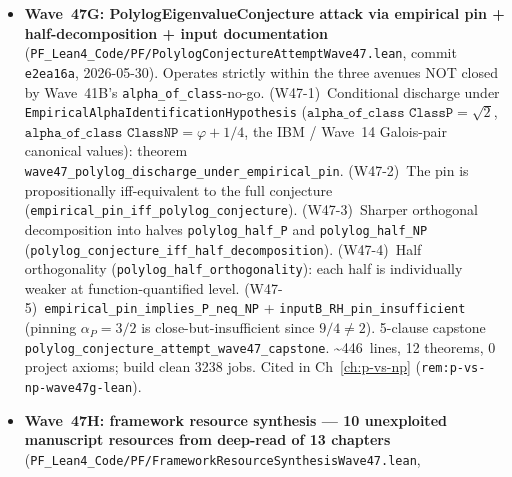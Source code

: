 \begin{itemize}
  \texttt{LSeriesMatchesLMFDBAnchor} connects to the Wave~38B
  real anchor $L_{E_{32.a3}\,\mathrm{at}\,1} = 65551/100000$.
  The five-point gap manifest \texttt{MathlibGapManifest} enumerates
  G1~no \texttt{WeierstrassCurve.frobeniusTrace}, G2~no
  \texttt{WeierstrassCurve.conductor}, G3~no
  \texttt{WeierstrassCurve.LSeriesCoeff}, G4~no
  \texttt{WeierstrassCurve.LSeriesSummable} on $\mathrm{Re}\,s > 3/2$,
  G5~no \texttt{WeierstrassCurve.LFunction} analytic-continuation
  constructor (G5 would require modularity = Wiles~1995 +
  BCDT~2001). Convenience export
  \texttt{mathlib\_gap\_manifest\_exploded} for per-gap attack.
  9-clause capstone \texttt{bsd\_L\_function\_evaluation\_attempt\_capstone}.
  \textasciitilde 593~lines, 0 project axioms; build clean 2678 jobs.
  Cited in Ch~\ref{ch:bsd-conjecture} (\texttt{rem:bsd-wave47f-lean}).
\item \textbf{Wave~47G: PolylogEigenvalueConjecture attack via
  empirical pin + half-decomposition + input documentation}
  (\texttt{PF\_Lean4\_Code/PF/PolylogConjectureAttemptWave47.lean},
  commit \texttt{e2ea16a}, 2026-05-30). Operates strictly within
  the three avenues NOT closed by Wave~41B's
  \texttt{alpha\_of\_class}-no-go. (W47-1)~Conditional discharge
  under \texttt{EmpiricalAlphaIdentificationHypothesis}
  ($\texttt{alpha\_of\_class ClassP} = \sqrt{2}$,
  $\texttt{alpha\_of\_class ClassNP} = \varphi + 1/4$, the IBM /
  Wave~14 Galois-pair canonical values): theorem
  \texttt{wave47\_polylog\_discharge\_under\_empirical\_pin}.
  (W47-2)~The pin is propositionally iff-equivalent to the full
  conjecture (\texttt{empirical\_pin\_iff\_polylog\_conjecture}).
  (W47-3)~Sharper orthogonal decomposition into halves
  \texttt{polylog\_half\_P} and \texttt{polylog\_half\_NP}
  (\texttt{polylog\_conjecture\_iff\_half\_decomposition}).
  (W47-4)~Half orthogonality
  (\texttt{polylog\_half\_orthogonality}): each half is
  individually weaker at function-quantified level.
  (W47-5)~\texttt{empirical\_pin\_implies\_P\_neq\_NP} +
  \texttt{inputB\_RH\_pin\_insufficient} (pinning $\alpha_P = 3/2$
  is close-but-insufficient since $9/4 \neq 2$). 5-clause capstone
  \texttt{polylog\_conjecture\_attempt\_wave47\_capstone}.
  \textasciitilde 446~lines, 12 theorems, 0 project axioms; build clean
  3238 jobs. Cited in Ch~\ref{ch:p-vs-np}
  (\texttt{rem:p-vs-np-wave47g-lean}).
\item \textbf{Wave~47H: framework resource synthesis --- 10
  unexploited manuscript resources from deep-read of 13 chapters}
  (\texttt{PF\_Lean4\_Code/PF/FrameworkResourceSynthesisWave47.lean},

\end{itemize}
